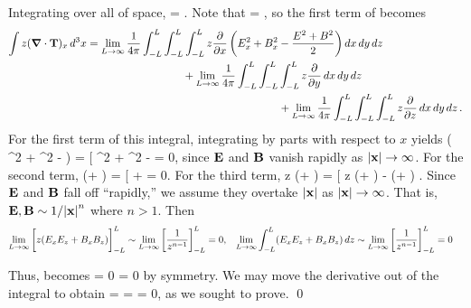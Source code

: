 \begin{solution}
	Integrating  over all of space,
	\beqn \label{friend2}
		\int {} \dcx =  \dcx.
	\eeqn
	Note that
	\beq
		\int {} \dcx = \limLi \intLL \intLL \intLL {} \dx \dy \dz,
	\eeq
	so the first term of  becomes
	\begin{align*}
		\int z (\grad \cdot \vb{T})_x \dd[3]{x} &= \lim_{L \to \infty} \frac{1}{4\pi} \int_{-L}^L \int_{-L}^L \int_{-L}^L z \pdv{}{x} \left( E_x^2 + B_x^2 - \frac{E^2 + B^2}{2} \right) \dd{x} \dd{y} \dd{z} \\
		&\phantom{mmmmmmmmmm} + \lim_{L \to \infty} \frac{1}{4\pi} \int_{-L}^L \int_{-L}^L \int_{-L}^L z \pdv{}{y} (E_x E_y + B_x B_y) \dd{x} \dd{y} \dd{z} \\
		&\phantom{mmmmmmmmmmmmmmmmmmmm} + \lim_{L \to \infty} \frac{1}{4\pi} \int_{-L}^L \int_{-L}^L \int_{-L}^L z \pdv{}{z} (E_x E_z + B_x B_z) \dd{x} \dd{y} \dd{z}.
	\end{align*}
	For the first term of this integral, integrating by parts with respect to $x$ yields
	\beq
		\limLi \intLL {} \left( \Ex^2 + \Bx^2 -  \right) \dx = \limLi \bigg[ \Ex^2 + \Bx^2 -  \bigLL = 0,
	\eeq
	since $\vb{E}$ and $\vb{B}$ vanish rapidly as $\abs{\vb{x}} \to \infty$.  For the second term,
	\beq
		\intLL {} (\Ex \Ey + \Bx \By) \dy = \limLi \bigg[ \Ex \Ey + \Bx \By \bigLL = 0.
	\eeq
	For the third term,
	\beq
		\intLL z  (\Ex \Ez + \Bx \Bz) \dz = \limLi \bigg[ z (\Ex \Ez + \Bx \Bz) \bigLL - \limLi \intLL (\Ex \Ez + \Bx \Bz) \dz.
	\eeq
	Since $\vb{E}$ and $\vb{B}$ fall off ``rapidly,'' we assume they overtake $\abs{\vb{x}}$ as $\abs{\vb{x}} \to \infty$.  That is, $\vb{E}, \vb{B} \sim 1/\abs{\vb{x}}^n$ where $n > 1$.  Then
	\begin{align*}
		\lim_{L \to \infty} \bigg[ z (E_x E_z + B_x B_z) \bigg]_{-L}^L &\sim \lim_{L \to \infty} \bigg[ \frac{1}{z^{n-1}} \bigg]_{-L}^L = 0, &
		\lim_{L \to \infty} \int_{-L}^L (E_x E_z + B_x B_z) \dd{z} &\sim \lim_{L \to \infty} \bigg[ \frac{1}{z^{n-1}} \bigg]_{-L}^L = 0
	\end{align*}
	
	Thus,  becomes
	\beq
		\int {} \dcx = 0 \implies \int {} \dcx = 0
	\eeq
	by symmetry.  We may move the derivative out of the integral to obtain
	\beq
		 =  \int \vl \dcx = \int {} \dcx = 0,
	\eeq
	as we sought to prove. \qed
\end{solution}